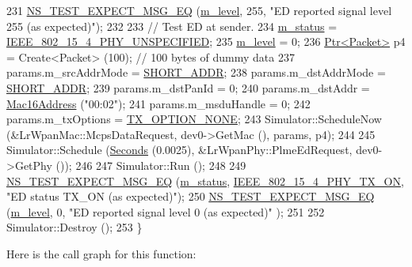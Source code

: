 \begin{DoxyCode}
231   \hyperlink{group__testing_ga7304ba46a28d8cf08dfdfd6499cf7068}{NS\_TEST\_EXPECT\_MSG\_EQ} (\hyperlink{classLrWpanEdTestCase_a7ecaee7923b4d55cc4a8545bc0332469}{m\_level}, 255, \textcolor{stringliteral}{"ED reported signal level 255 (as
       expected)"});
232 
233   \textcolor{comment}{// Test ED at sender.}
234   \hyperlink{classLrWpanEdTestCase_a412f77be5f81e80661cf8e5563e62851}{m\_status} = \hyperlink{group__lr-wpan_gga6494269d13d45c511a07b7ccbb1de754a33aedad985a3e4dd7a0c6790a2c677a0}{IEEE\_802\_15\_4\_PHY\_UNSPECIFIED};
235   \hyperlink{classLrWpanEdTestCase_a7ecaee7923b4d55cc4a8545bc0332469}{m\_level} = 0;
236   \hyperlink{classns3_1_1Ptr}{Ptr<Packet>} p4 = Create<Packet> (100);  \textcolor{comment}{// 100 bytes of dummy data}
237   params.m\_srcAddrMode = \hyperlink{group__lr-wpan_gga9ea4702ab11d5329e1593afebce06bbba7bf58267dde39bdabfeeb5793450c5e3}{SHORT\_ADDR};
238   params.m\_dstAddrMode = \hyperlink{group__lr-wpan_gga9ea4702ab11d5329e1593afebce06bbba7bf58267dde39bdabfeeb5793450c5e3}{SHORT\_ADDR};
239   params.m\_dstPanId = 0;
240   params.m\_dstAddr = \hyperlink{classns3_1_1Mac16Address}{Mac16Address} (\textcolor{stringliteral}{"00:02"});
241   params.m\_msduHandle = 0;
242   params.m\_txOptions = \hyperlink{group__lr-wpan_gga74ea891230ebf45d80d69a67266930a4a873c8b896435efcdd1c058668efb88ea}{TX\_OPTION\_NONE};
243   Simulator::ScheduleNow (&LrWpanMac::McpsDataRequest, dev0->GetMac (), params, p4);
244 
245   Simulator::Schedule (\hyperlink{group__timecivil_ga33c34b816f8ff6628e33d5c8e9713b9e}{Seconds} (0.0025), &LrWpanPhy::PlmeEdRequest, dev0->GetPhy ());
246 
247   Simulator::Run ();
248 
249   \hyperlink{group__testing_ga7304ba46a28d8cf08dfdfd6499cf7068}{NS\_TEST\_EXPECT\_MSG\_EQ} (\hyperlink{classLrWpanEdTestCase_a412f77be5f81e80661cf8e5563e62851}{m\_status}, 
      \hyperlink{group__lr-wpan_gga6494269d13d45c511a07b7ccbb1de754aa595d552b56b89b363b800b9fcfbe67f}{IEEE\_802\_15\_4\_PHY\_TX\_ON}, \textcolor{stringliteral}{"ED status TX\_ON (as expected)"});
250   \hyperlink{group__testing_ga7304ba46a28d8cf08dfdfd6499cf7068}{NS\_TEST\_EXPECT\_MSG\_EQ} (\hyperlink{classLrWpanEdTestCase_a7ecaee7923b4d55cc4a8545bc0332469}{m\_level}, 0, \textcolor{stringliteral}{"ED reported signal level 0 (as expected)"}
      );
251 
252   Simulator::Destroy ();
253 \}
\end{DoxyCode}


Here is the call graph for this function\+:


